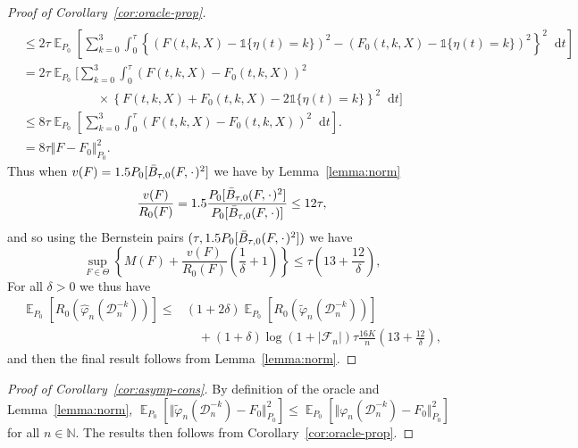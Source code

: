 \documentclass{statsoc}
\numberwithin{theorem}{section}
\DeclareMathOperator{\E}{\mathbb{E}} %
\newcommand{\N}{\mathbb{N}}
\newcommand{\blank}{\makebox[1ex]{\textbf{$\cdot$}}}
\renewcommand{\phi}{\varphi}
\newcommand*\diff{\mathop{}\!\mathrm{d}}
\newcommand{\1}{\mathds{1}}
\newcommand{\data}{\ensuremath{\mathcal{D}}}
\begin{document}
\begin{proof}[Proof of Corollary~\ref{cor:oracle-prop}]
\begin{align*}
  \\
  & \leq
    2\tau\E_{P_0}{\left[
    \sum_{k=0}^{3} \int_0^{\tau}
    \left\{
    \left(
    F(t, k, X) - \1{\{\eta(t) = k\}}
    \right)^2
    -
    \left(
    F_0(t, k, X) - \1{\{\eta(t) = k\}}
    \right)^2
    \right\}^2
    \diff t 
    \right]}
  \\
  & =2\tau
    \E_{P_0}\Bigg[
    \sum_{k=0}^{3} \int_0^{\tau}
    \left(
    F(t, k, X) - F_0(t, k, X)
    \right)^2
  \\
  & \quad \quad \quad\quad \quad \quad \times
    \left\{
    F(t, k, X) +  F_0(t, k, X)-2 \1{\{\eta(t) = k\}}
    \right\}^2
    \diff t 
    \Bigg]
  \\
  & \leq
    8\tau \E_{P_0}{\left[
    \sum_{k=0}^{3} \int_0^{\tau}
    \left(
    F(t, k, X) - F_0(t, k, X)
    \right)^2
    \diff t 
    \right]}.
  \\
  & =
    8\tau \Vert F - F_0 \Vert_{P_0}^2.
\end{align*}
Thus when \( v(F) = 1.5 P_0{[\bar{B}_{\tau,0}(F, \blank)^2]} \) we have by
Lemma~\ref{lemma:norm}
\begin{equation*}
  \frac{v(F)}{R_0(F)}
  = 1.5 \frac{P_0{[\bar{B}_{\tau,0}(F, \blank)^2]}}{P_0{[\bar{B}_{\tau,0}(F, \blank)]}}
  \leq 12 \tau,
\end{equation*}
and so using the Bernstein pairs \( (\tau, 1.5 P_0{[\bar{B}_{\tau,0}(F, \blank)^2]}) \) we have
\begin{equation*}
  \sup_{F \in \Theta}
  \left\{
    M(F) + \frac{v(F)}{R_0(F)}
    \left(
      \frac{1}{\delta} + 1
    \right)
  \right\}
  \leq \tau
  \left(
    13 + \frac{12}{\delta}
  \right),
\end{equation*}
For all $\delta>0$ we thus have
\begin{align*}
  \E_{P_0}{\left[ R_0(\hat{\phi}_n(\data_n^{-k})) \right]}
  \leq
  &(1+2\delta)\E_{P_0}{\left[ R_0(\tilde{\phi}_n(\data_n^{-k})) \right]}
  \\
  & \quad
    + (1+\delta)\log(1 + |\mathcal{F}_n|) \tau \frac{16 K}{n}
    \left(
    13 + \frac{12}{\delta}
    \right),
\end{align*}
and then the final result follows from Lemma~\ref{lemma:norm}.
\end{proof}

\begin{proof}[Proof of Corollary~\ref{cor:asymp-cons}]
  By definition of the oracle and Lemma~\ref{lemma:norm},
  \( \E_{P_0}{\left[ \Vert \tilde{\phi}_n(\data_n^{-k}) - F_0 \Vert_{P_0}^2 \right]}
  \leq \E_{P_0}{\left[ \Vert \phi_n(\data_n^{-k}) - F_0 \Vert_{P_0}^2 \right]} \) for
  all \( n \in \N \). The results then follows from
  Corollary~\ref{cor:oracle-prop}.
\end{proof}
\end{document}
